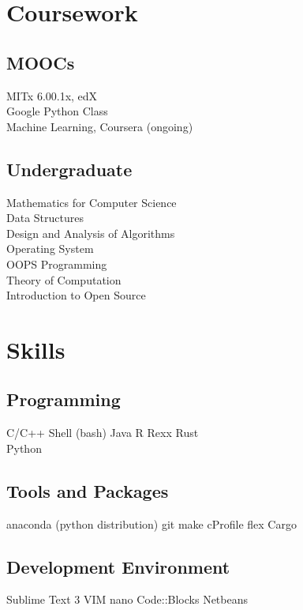 \documentclass[]{deedy-resume-openfont}
\begin{document}
\begin{minipage}[t]{0.33\textwidth}

\section{Coursework}
\subsection{MOOCs}
MITx 6.00.1x, edX \\
Google Python Class \\
Machine Learning, Coursera (ongoing)\\
\sectionsep

\subsection{Undergraduate}
Mathematics for Computer Science \\
Data Structures \\
Design and Analysis of Algorithms \\
Operating System \\
OOPS Programming \\
Theory of Computation \\
Introduction to Open Source \\
\sectionsep


\section{Skills}
\subsection{Programming}
\textbullet{} C/C++ \textbullet{} Shell (bash) \textbullet{} Java \textbullet{} R \textbullet{} Rexx \textbullet{} Rust \\
\textbullet{}Python
\subsection{Tools and Packages}
\textbullet{} anaconda (python distribution) \textbullet{} git \textbullet{} make \textbullet{} cProfile \textbullet{} flex \textbullet{} Cargo 
\subsection{Development Environment}
\textbullet{} Sublime Text 3 \textbullet{} VIM \textbullet{} nano \textbullet{} Code::Blocks \textbullet{} Netbeans
\sectionsep

%
%

\end{minipage}
\end{document}
